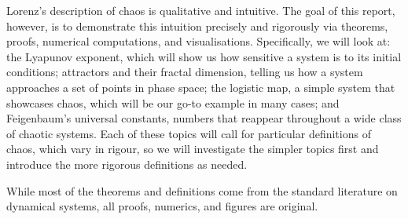 Lorenz's description of chaos is qualitative and intuitive. 
The goal of this report, however, is to demonstrate this intuition precisely and rigorously via theorems, proofs, numerical computations, and visualisations.
Specifically, we will look at: the Lyapunov exponent, which will show us how sensitive a system is to its initial conditions; attractors and their fractal dimension, telling us how a system approaches a set of points in phase space; the logistic map, a simple system that showcases chaos, which will be our go-to example in many cases; and Feigenbaum's universal constants, numbers that reappear throughout a wide class of chaotic systems. 
Each of these topics will call for particular definitions of chaos, which vary in rigour, so we will investigate the simpler topics first and introduce the more rigorous definitions as needed.

While most of the theorems and definitions come from the standard literature on dynamical systems, all proofs, numerics, and figures are original.